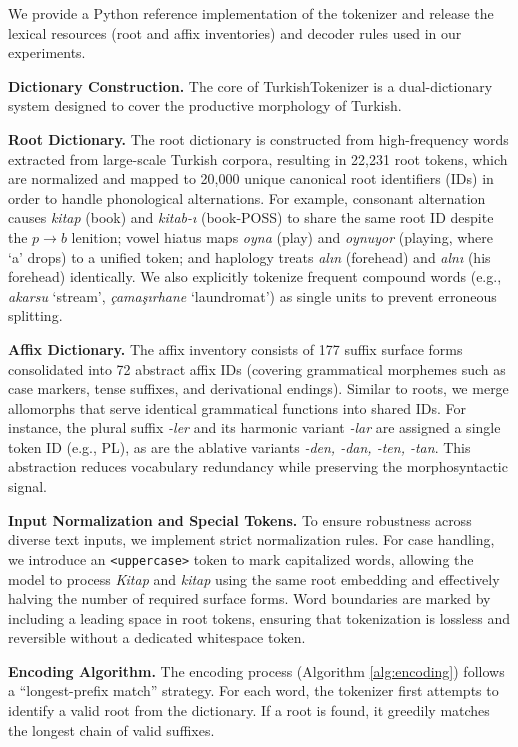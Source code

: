 We provide a Python reference implementation of the tokenizer and release the lexical resources (root and affix inventories) and decoder rules used in our experiments.

\textbf{Dictionary Construction.} The core of TurkishTokenizer is a dual-dictionary system designed to cover the productive morphology of Turkish.

\textbf{Root Dictionary.} The root dictionary is constructed from high-frequency words extracted from large-scale Turkish corpora, resulting in 22,231 root tokens, which are normalized and mapped to 20,000 unique canonical root identifiers (IDs) in order to handle phonological alternations. For example, consonant alternation causes \textit{kitap} (book) and \textit{kitab-ı} (book-POSS) to share the same root ID despite the $p \to b$ lenition; vowel hiatus maps \textit{oyna} (play) and \textit{oynuyor} (playing, where `a' drops) to a unified token; and haplology treats \textit{alın} (forehead) and \textit{alnı} (his forehead) identically. We also explicitly tokenize frequent compound words (e.g., \textit{akarsu} `stream', \textit{çamaşırhane} `laundromat') as single units to prevent erroneous splitting.

\textbf{Affix Dictionary.} The affix inventory consists of 177 suffix surface forms consolidated into 72 abstract affix IDs (covering grammatical morphemes such as case markers, tense suffixes, and derivational endings). Similar to roots, we merge allomorphs that serve identical grammatical functions into shared IDs. For instance, the plural suffix \textit{-ler} and its harmonic variant \textit{-lar} are assigned a single token ID (e.g., \textsc{PL}), as are the ablative variants \textit{-den, -dan, -ten, -tan}. This abstraction reduces vocabulary redundancy while preserving the morphosyntactic signal.

\textbf{Input Normalization and Special Tokens.} To ensure robustness across diverse text inputs, we implement strict normalization rules. For case handling, we introduce an \texttt{<uppercase>} token to mark capitalized words, allowing the model to process \textit{Kitap} and \textit{kitap} using the same root embedding and effectively halving the number of required surface forms. Word boundaries are marked by including a leading space in root tokens, ensuring that tokenization is lossless and reversible without a dedicated whitespace token.

\textbf{Encoding Algorithm.} The encoding process (Algorithm \ref{alg:encoding}) follows a ``longest-prefix match'' strategy. For each word, the tokenizer first attempts to identify a valid root from the dictionary. If a root is found, it greedily matches the longest chain of valid suffixes.

